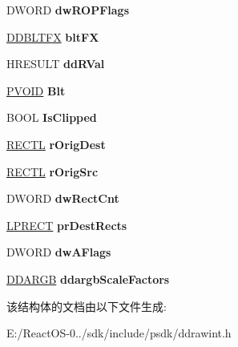 \begin{DoxyCompactItemize}
D\+W\+O\+RD {\bfseries dw\+R\+O\+P\+Flags}
\item 
\mbox{\label{struct___d_d___b_l_t_d_a_t_a_ab938136cda6d6852ab6ec3e6c312fc2f}} 
\hyperlink{struct___d_d_b_l_t_f_x}{D\+D\+B\+L\+T\+FX} {\bfseries blt\+FX}
\item 
\mbox{\label{struct___d_d___b_l_t_d_a_t_a_ada55b86f09ea042b89de3ed2f5ec6e30}} 
H\+R\+E\+S\+U\+LT {\bfseries dd\+R\+Val}
\item 
\mbox{\label{struct___d_d___b_l_t_d_a_t_a_a5a92b5edff9c3ceafdc29696a298d9bd}} 
\hyperlink{interfacevoid}{P\+V\+O\+ID} {\bfseries Blt}
\item 
\mbox{\label{struct___d_d___b_l_t_d_a_t_a_a8fd60b09c15b42da8fd4c610cd2aa481}} 
B\+O\+OL {\bfseries Is\+Clipped}
\item 
\mbox{\label{struct___d_d___b_l_t_d_a_t_a_a05bcf97530c9e735195cde7b1c350c00}} 
\hyperlink{struct___r_e_c_t_l}{R\+E\+C\+TL} {\bfseries r\+Orig\+Dest}
\item 
\mbox{\label{struct___d_d___b_l_t_d_a_t_a_a1689347f7e2295d0f8115fea9e6e63ff}} 
\hyperlink{struct___r_e_c_t_l}{R\+E\+C\+TL} {\bfseries r\+Orig\+Src}
\item 
\mbox{\label{struct___d_d___b_l_t_d_a_t_a_ad6fd610b349a6e9a64e5b795e02769de}} 
D\+W\+O\+RD {\bfseries dw\+Rect\+Cnt}
\item 
\mbox{\label{struct___d_d___b_l_t_d_a_t_a_a3c5eba2910535c30b1d7564a486f50b1}} 
\hyperlink{structtag_r_e_c_t}{L\+P\+R\+E\+CT} {\bfseries pr\+Dest\+Rects}
\item 
\mbox{\label{struct___d_d___b_l_t_d_a_t_a_aff9dc8db745971c6324c262771487375}} 
D\+W\+O\+RD {\bfseries dw\+A\+Flags}
\item 
\mbox{\label{struct___d_d___b_l_t_d_a_t_a_ad69b5e82def62714c7f8608a6e17a94e}} 
\hyperlink{struct___d_d_a_r_g_b}{D\+D\+A\+R\+GB} {\bfseries ddargb\+Scale\+Factors}
\end{DoxyCompactItemize}


该结构体的文档由以下文件生成\+:\begin{DoxyCompactItemize}
\item 
E\+:/\+React\+O\+S-\/0../sdk/include/psdk/ddrawint.\+h\end{DoxyCompactItemize}
